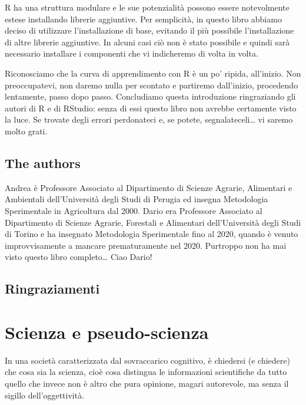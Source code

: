\documentclass[a4paper,12pt,oneside]{book}
\begin{document}
R ha una struttura modulare e le sue potenzialità possono essere notevolmente estese installando librerie aggiuntive. Per semplicità, in questo libro abbiamo deciso di utilizzare l'installazione di base, evitando il più possibile l'installazione di altre librerie aggiuntive. In alcuni casi ciò non è stato possibile e quindi sarà necessario installare i componenti che vi indicheremo di volta in volta.

Riconosciamo che la curva di apprendimento con R è un po' ripida, all'inizio. Non preoccupatevi, non daremo nulla per scontato e partiremo dall'inizio, procedendo lentamente, passo dopo passo. Concludiamo questa introduzione ringraziando gli autori di R e di RStudio: senza di essi questo libro non avrebbe certamente visto la luce. Se trovate degli errori perdonateci e, se potete, segnalateceli\ldots{} vi saremo molto grati.

\hypertarget{the-authors}{%
\section*{The authors}\label{the-authors}}

Andrea è Professore Associato al Dipartimento di Scienze Agrarie, Alimentari e Ambientali dell'Università degli Studi di Perugia ed insegna Metodologia Sperimentale in Agricoltura dal 2000. Dario era Professore Associato al Dipartimento di Scienze Agrarie, Forestali e Alimentari dell'Università degli Studi di Torino e ha insegnato Metodologia Sperimentale fino al 2020, quando è venuto improvvisamente a mancare prematuramente nel 2020. Purtroppo non ha mai visto questo libro completo\ldots{} Ciao Dario!

\hypertarget{ringraziamenti}{%
\section*{Ringraziamenti}\label{ringraziamenti}}

\hypertarget{scienza-e-pseudo-scienza}{%
\chapter{Scienza e pseudo-scienza}\label{scienza-e-pseudo-scienza}}

In una società caratterizzata dal sovraccarico cognitivo, è chiedersi (e chiedere) che cosa sia la scienza, cioè cosa distingua le informazioni scientifiche da tutto quello che invece non è altro che pura opinione, magari autorevole, ma senza il sigillo dell'oggettività.
\end{document}
